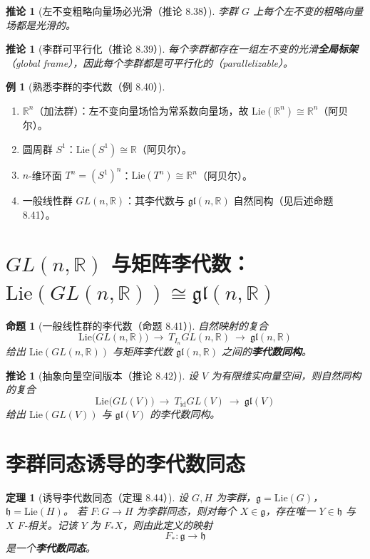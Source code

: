 \documentclass[11pt,a4paper]{article}
\newcommand{\R}{\mathbb{R}}
\newcommand{\gl}{\mathfrak{gl}}
\newcommand{\Lie}{\mathrm{Lie}}
\newcommand{\id}{\mathrm{id}}
\theoremstyle{definition}
\newtheorem{example}[definition]{例}
\theoremstyle{plain}
\newtheorem{theorem}[definition]{定理}
\newtheorem{proposition}[definition]{命题}
\newtheorem{corollary}[definition]{推论}
\begin{document}
\begin{corollary}[左不变粗略向量场必光滑（推论 8.38）]
李群 $G$ 上每个左不变的粗略向量场都是光滑的。
\end{corollary}

\begin{corollary}[李群可平行化（推论 8.39）]
每个李群都存在一组左不变的光滑\textbf{全局标架}（global frame），因此每个李群都是可平行化的（parallelizable）。
\end{corollary}

\begin{example}[熟悉李群的李代数（例 8.40）]
\begin{enumerate}[label=(\alph*)]
\item $\R^n$（加法群）：左不变向量场恰为常系数向量场，故 $\Lie(\R^n)\cong \R^n$（阿贝尔）。
\item 圆周群 $S^1$：$\Lie(S^1)\cong \R$（阿贝尔）。
\item $n$-维环面 $T^n=(S^1)^n$：$\Lie(T^n)\cong \R^n$（阿贝尔）。
\item 一般线性群 $GL(n,\R)$：其李代数与 $\gl(n,\R)$ 自然同构（见后述命题 8.41）。
\end{enumerate}
\end{example}

\section{$GL(n,\R)$ 与矩阵李代数：$\Lie(GL(n,\R))\cong\gl(n,\R)$}

\begin{proposition}[一般线性群的李代数（命题 8.41）]
自然映射的复合
\[
\Lie\bigl(GL(n,\R)\bigr)\ \longrightarrow\ T_{I_n}GL(n,\R)\ \longrightarrow\ \gl(n,\R) \tag{8.14}
\]
给出 $\Lie(GL(n,\R))$ 与矩阵李代数 $\gl(n,\R)$ 之间的\textbf{李代数同构}。
\end{proposition}

\begin{corollary}[抽象向量空间版本（推论 8.42）]
设 $V$ 为有限维实向量空间，则自然同构的复合
\[
\Lie\bigl(GL(V)\bigr)\ \longrightarrow\ T_{\id}GL(V)\ \longrightarrow\ \gl(V) \tag{8.16}
\]
给出 $\Lie(GL(V))$ 与 $\gl(V)$ 的李代数同构。
\end{corollary}

\section{李群同态诱导的李代数同态}

\begin{theorem}[诱导李代数同态（定理 8.44）]
设 $G,H$ 为李群，$\mathfrak g=\Lie(G)$，$\mathfrak h=\Lie(H)$。
若 $F:G\to H$ 为李群同态，则对每个 $X\in\mathfrak g$，存在唯一 $Y\in\mathfrak h$
与 $X$ $F$-相关。记该 $Y$ 为 $F_*X$，则由此定义的映射
\[
F_*:\mathfrak g\to\mathfrak h
\]
是一个\textbf{李代数同态}。
\end{theorem}
\end{document}
